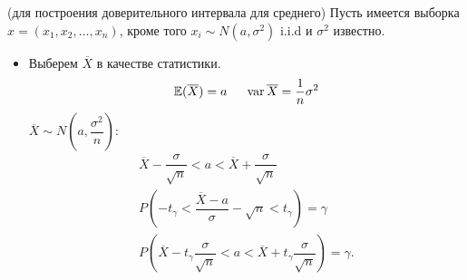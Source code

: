 \Ex (для построения доверительного интервала для среднего)
Пусть имеется выборка $x = \left(x_1, x_2, \ldots, x_n\right)$, кроме того $x_i \sim N(a, \sigma^2)$ i.i.d и $\sigma^2$ известно.
\begin{itemize}
    \item Выберем $\overline{X}$ в качестве статистики.
    \[
        \mathbb{E}(\overline{X}) = a \hspace*{0.5cm} \operatorname{var} \overline{X} = \dfrac{1}{n}\sigma^2  
    \]
    $\overline{X} \sim N\left(a, \dfrac{\sigma^2}{n}\right)$:
    \[
        \begin{array}{c}
            \displaystyle \overline{X} - \dfrac{\sigma}{\sqrt{n}} < a < \overline{X} + \dfrac{\sigma}{\sqrt{n}} \\[0.5cm]
            \displaystyle P\left(-t_{\gamma} < \dfrac{\overline{X} - a}{\sigma} - \sqrt{n} < t_{\gamma}\right) = \gamma\\[0.5cm]
            \displaystyle P\left(\overline{X} - t_{\gamma} \dfrac{\sigma}{\sqrt{n}} < a < \overline{X} + t_{\gamma} \dfrac{\sigma}{\sqrt{n}}\right) = \gamma.
        \end{array}  
    \]
\end{itemize}